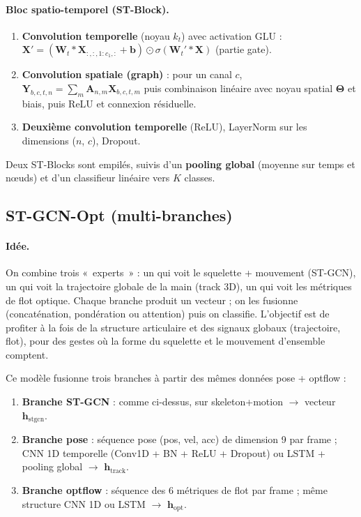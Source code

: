\documentclass[11pt,a4paper]{article}
\begin{document}
\paragraph{Bloc spatio-temporel (ST-Block).}
\begin{enumerate}
  \item \textbf{Convolution temporelle} (noyau $k_t$) avec activation GLU : 
  $\mathbf{X}' = (\mathbf{W}_t \ast \mathbf{X}_{:,:,1:c_1,:} + \mathbf{b}) \odot \sigma(\mathbf{W}_t' \ast \mathbf{X})$ (partie gate).
  \item \textbf{Convolution spatiale (graph)} : pour un canal $c$, 
  $\mathbf{Y}_{b,c,t,n} = \sum_{m} \mathbf{A}_{n,m} \mathbf{X}_{b,c,t,m}$ puis combinaison linéaire avec noyau spatial $\boldsymbol{\Theta}$ et biais, puis ReLU et connexion résiduelle.
  \item \textbf{Deuxième convolution temporelle} (ReLU), LayerNorm sur les dimensions ($n$, $c$), Dropout.
\end{enumerate}

Deux ST-Blocks sont empilés, suivis d’un \textbf{pooling global} (moyenne sur temps et nœuds) et d’un classifieur linéaire vers $K$ classes.

\subsection{ST-GCN-Opt (multi-branches)}

\paragraph{Idée.} On combine trois «~experts~» : un qui voit le squelette + mouvement (ST-GCN), un qui voit la trajectoire globale de la main (track 3D), un qui voit les métriques de flot optique. Chaque branche produit un vecteur ; on les fusionne (concaténation, pondération ou attention) puis on classifie. L’objectif est de profiter à la fois de la structure articulaire et des signaux globaux (trajectoire, flot), pour des gestes où la forme du squelette et le mouvement d’ensemble comptent.

Ce modèle fusionne trois branches à partir des mêmes données pose + optflow :
\begin{enumerate}
  \item \textbf{Branche ST-GCN} : comme ci-dessus, sur skeleton+motion $\to$ vecteur $\mathbf{h}_{\mathrm{stgcn}}$.
  \item \textbf{Branche pose} : séquence pose (pos, vel, acc) de dimension 9 par frame ; CNN 1D temporelle (Conv1D + BN + ReLU + Dropout) ou LSTM + pooling global $\to$ $\mathbf{h}_{\mathrm{track}}$.
  \item \textbf{Branche optflow} : séquence des 6 métriques de flot par frame ; même structure CNN 1D ou LSTM $\to$ $\mathbf{h}_{\mathrm{opt}}$.
\end{enumerate}
\end{document}
